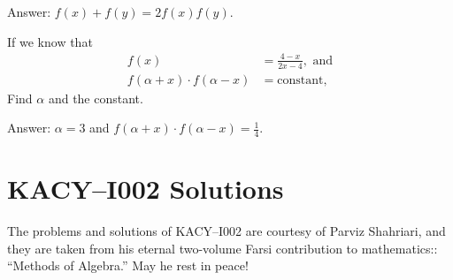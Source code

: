 \documentclass[12pt,a4paper]{memoir}
\theoremstyle{definition}
\begin{document}
\begin{solution}%
	Answer: $f(x)+f(y) = 2f(x)f(y)$.
\end{solution}

\setcounter{question}{113}


\begin{tcolorbox}
	\begin{question}
		If we know that
		\begin{align*}
			f(x) &= \frac{4-x}{2x-4}, \text{ and}\\
			f(\alpha+x) \cdot f(\alpha-x) &= \text{constant},
		\end{align*}
		Find $\alpha$ and the constant.
	\end{question}
\end{tcolorbox}

\begin{solution}%
	Answer: $\alpha=3$ and $f(\alpha+x) \cdot f(\alpha-x) = \frac{1}{4}$.
\end{solution}

\section*{KACY--I002 Solutions}
%	
The problems and solutions of KACY--I002 are courtesy of Parviz Shahriari, and they are taken from his eternal two-volume Farsi contribution to mathematics:: ``Methods of Algebra.'' May he rest in peace!

	\printsolutions
\end{document}
